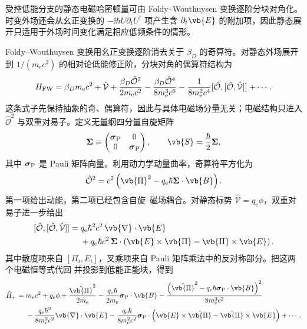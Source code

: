 受控低能分支的静态电磁哈密顿量可由 Foldy--Wouthuysen 变换逐阶分块对角化。时变外场还会从幺正变换的 $-\ii\hbar U\partial_tU^\dagger$ 项产生含 $\partial_t\vb{E}$ 的附加项，因此静态展开只适用于外场时间变化满足相应低频条件的情形。

Foldy--Wouthuysen 变换用幺正变换逐阶消去关于 $\beta_D$ 的奇算符。对静态外场展开到 $1/(m_{\mathrm e} c^2)$ 的相对论低能修正阶，分块对角的偶算符结构为
\begin{equation}
 {
 H_{\rm FW}
 =\beta_Dm_{\mathrm e} c^2+\hat{\mathcal V}
 +\frac{\beta_D\hat{\mathcal O}^2}{2m_{\mathrm e} c^2}
 -\frac{\beta_D\hat{\mathcal O}^4}{8m_{\mathrm e}^3c^6}
 -\frac{1}{8m_{\mathrm e}^2c^4}[\hat{\mathcal O},[\hat{\mathcal O},\hat{\mathcal V}]]
 +\cdots.}
 \label{eq:fw-even-operator-form-r16}
\end{equation}
这条式子先保持抽象的奇、偶算符，因此与具体电磁场分量无关；电磁结构只进入 $\hat{\mathcal O}^2$ 与双重对易子。定义无量纲四分量自旋矩阵
\begin{equation*}
 \boldsymbol\Sigma
 \equiv
 \begin{pmatrix}
 \boldsymbol\sigma_{\rm P}&0\\
 0&\boldsymbol\sigma_{\rm P}
 \end{pmatrix},
 \qquad
 \vb{S}=\frac{\hbar}{2}\boldsymbol\Sigma,
\end{equation*}
其中 $\boldsymbol\sigma_{\rm P}$ 是 Pauli 矩阵向量。利用动力学动量曲率，奇算符平方化为
\begin{equation}
 {
 \hat{\mathcal O}^2
 =c^2\left(
 \vb{\Pi}^2-q_{\mathrm e}\hbar\boldsymbol\Sigma\cdot\vb{B}
 \right).}
 \label{eq:fw-O2-r16}
\end{equation}
第一项给出动能，第二项已经包含自旋--磁场耦合。对静态标势 $\hat{\mathcal V}=q_{\mathrm e}\phi$，双重对易子进一步给出
\begin{equation}
 {
 \begin{aligned}
 [\hat{\mathcal O},[\hat{\mathcal O},\hat{\mathcal V}]]
 ={}&q_{\mathrm e}\hbar^2c^2\,\vb{\nabla}\cdot\vb{E}\\
 &+q_{\mathrm e}\hbar c^2\,
 \boldsymbol\Sigma\cdot
 \left(
 \vb{E}\times\vb{\Pi}
 -\vb{\Pi}\times\vb{E}
 \right).
 \end{aligned}}
 \label{eq:fw-double-commutator-r16}
\end{equation}
其中散度项来自 $[\Pi_i,E_i]$，叉乘项来自 Pauli 矩阵乘法中的反对称部分。把这两个电磁恒等式代回  并投影到低能正能块，得到
\begin{equation}
 {
 \begin{aligned}
 \hat H_{+}
 ={}&m_{\mathrm e} c^2+q_{\mathrm e}\phi
 +\frac{\hat{\vb{\Pi}}^2}{2m_{\mathrm e}}
 -\frac{q_{\mathrm e}\hbar}{2m_{\mathrm e}}\boldsymbol\sigma_{\rm P}\cdot\vb{B}
 -\frac{\left(\hat{\vb{\Pi}}^2-q_{\mathrm e}\hbar\boldsymbol\sigma_{\rm P}\cdot\vb{B}\right)^2}{8m_{\mathrm e}^3c^2}\\
 &-\frac{q_{\mathrm e}\hbar^2}{8m_{\mathrm e}^2c^2}\vb{\nabla}\cdot\vb{E}
 -\frac{q_{\mathrm e}\hbar}{8m_{\mathrm e}^2c^2}
 \boldsymbol\sigma_{\rm P}\cdot
 \left(\vb{E}\times\hat{\vb{\Pi}}
 -\hat{\vb{\Pi}}\times\vb{E}\right)+\cdots.
 \end{aligned}}
 \label{eq:fw-pauli}
\end{equation}
